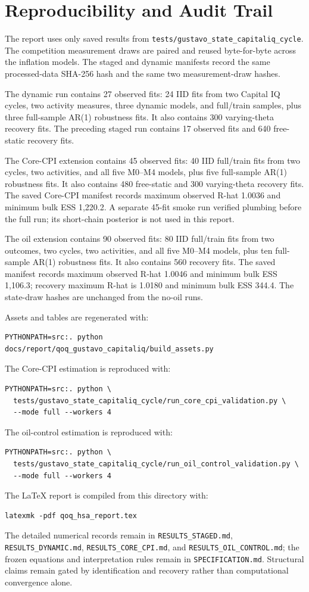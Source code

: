 \documentclass[11pt]{article}
\newcommand{\code}[1]{\texttt{#1}}
\begin{document}
\section{Reproducibility and Audit Trail}

The report uses only saved results from
\code{tests/gustavo\_state\_capitaliq\_cycle}. The competition measurement draws are paired
and reused byte-for-byte across the inflation models. The staged and dynamic manifests record
the same processed-data SHA-256 hash and the same two measurement-draw hashes.

The dynamic run contains 27 observed fits: 24 IID fits from two Capital IQ cycles, two
activity measures, three dynamic models, and full/train samples, plus three full-sample AR(1)
robustness fits. It also contains 300 varying-theta recovery fits. The preceding staged run
contains 17 observed fits and 640 free-static recovery fits.

The Core-CPI extension contains 45 observed fits: 40 IID full/train fits from two cycles,
two activities, and all five M0--M4 models, plus five full-sample AR(1) robustness fits. It
also contains 480 free-static and 300 varying-theta recovery fits. The saved Core-CPI manifest
records maximum observed R-hat 1.0036 and minimum bulk ESS 1,220.2. A separate 45-fit smoke
run verified plumbing before the full run; its short-chain posterior is not used in this report.

The oil extension contains 90 observed fits: 80 IID full/train fits from two outcomes, two
cycles, two activities, and all five M0--M4 models, plus ten full-sample AR(1) robustness
fits. It also contains 560 recovery fits. The saved manifest records maximum observed R-hat
1.0046 and minimum bulk ESS 1,106.3; recovery maximum R-hat is 1.0180 and minimum bulk ESS
344.4. The state-draw hashes are unchanged from the no-oil runs.

Assets and tables are regenerated with:
\begin{verbatim}
PYTHONPATH=src:. python docs/report/qoq_gustavo_capitaliq/build_assets.py
\end{verbatim}
The Core-CPI estimation is reproduced with:
\begin{verbatim}
PYTHONPATH=src:. python \
  tests/gustavo_state_capitaliq_cycle/run_core_cpi_validation.py \
  --mode full --workers 4
\end{verbatim}
The oil-control estimation is reproduced with:
\begin{verbatim}
PYTHONPATH=src:. python \
  tests/gustavo_state_capitaliq_cycle/run_oil_control_validation.py \
  --mode full --workers 4
\end{verbatim}
The LaTeX report is compiled from this directory with:
\begin{verbatim}
latexmk -pdf qoq_hsa_report.tex
\end{verbatim}

The detailed numerical records remain in \code{RESULTS\_STAGED.md},
\code{RESULTS\_DYNAMIC.md}, \code{RESULTS\_CORE\_CPI.md}, and
\code{RESULTS\_OIL\_CONTROL.md}; the frozen equations and
interpretation rules remain in \code{SPECIFICATION.md}. Structural claims remain gated by
identification and recovery rather than computational convergence alone.
\end{document}
